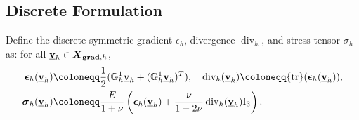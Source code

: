 \documentclass[a4paper,11pt]{article}
\theoremstyle{definition}
\theoremstyle{remark}
\newcommand{\uvec}[1]{\underline{\mathbf{#1}}}
\newcommand{\dgr}[1]{\mathbb G^1_{#1}}
\def\bsig{\boldsymbol{\sigma}}
\def\be{\boldsymbol{\epsilon}}
\newcommand{\Id}{\mathrm{I}_3}
\def\dgs{\boldsymbol{X}_{{\bf grad},h}}
\def\tr{{\rm {tr}}}
\newcommand{\DIV}{\operatorname{\mathrm{div}}}
\begin{document}
\subsection{Discrete Formulation}\label{subsec discrete_formulation}

Define the discrete symmetric gradient $\epsilon_h$, divergence $\DIV_h$, and stress tensor $\sigma_h$ as: for all $\uvec{v}_h\in\dgs$,
\begin{alignat}{2}
\be_h(\uvec{v}_h)&\coloneqq\frac{1}{2}(\dgr{h}\uvec{v}_h+(\dgr{h}\uvec{v}_h)^T),\quad\DIV_h(\uvec{v}_h)\coloneqq \tr(\be_h(\uvec{v}_h)),\nonumber\\
 \bsig_h(\uvec{v}_h)&\coloneqq \frac{E}{1+\nu}\left(\be_h(\uvec{v}_h)+\frac{\nu}{1-2\nu} \DIV_h(\uvec{v}_h)\Id\right).
 \label{eq:def.sigma.h}
\end{alignat}
\end{document}
